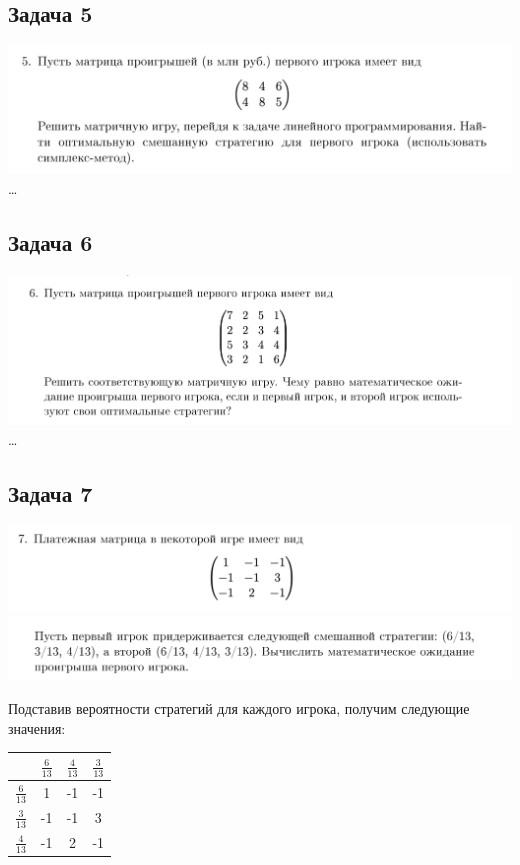 \documentclass[11pt, a4paper]{article}
\begin{document}
    \subsection{Задача 5}\label{subsec:task5}
    \includegraphics[width=1\textwidth]{docs/5}
    \dots

    \newpage

    \subsection{Задача 6}\label{subsec:task6}
    \includegraphics[width=1\textwidth]{docs/6}
    \dots

    \newpage

    \subsection{Задача 7}\label{subsec:task7}
    \includegraphics[width=1\textwidth]{docs/7_1}
    \includegraphics[width=1\textwidth]{docs/7_2}

    Подставив вероятности стратегий для каждого игрока, получим следующие значения:

    \begin{table}[h]
        \begin{tabular}{|c|c|c|c|}
            \hline
            & $\frac{6}{13}$ & $\frac{4}{13}$ & $\frac{3}{13}$ \\
            \hline
            $\frac{6}{13}$ & 1              & -1             & -1             \\
            \hline
            $\frac{3}{13}$ & -1             & -1             & 3              \\
            \hline
            $\frac{4}{13}$ & -1             & 2              & -1             \\
            \hline
        \end{tabular}\label{tab:table2}
    \end{table}
\end{document}
